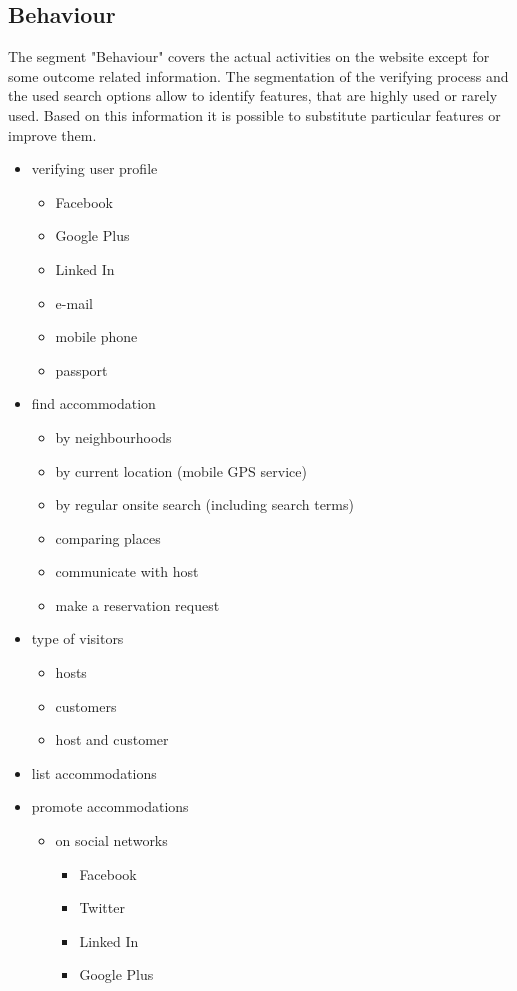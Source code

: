 \subsection{Behaviour}
The segment "Behaviour" covers the actual activities on the website except for some outcome related information. The segmentation of the verifying process and the used search options allow to identify features, that are highly used or rarely used. Based on this information it is possible to substitute particular features or improve them. 

\begin{itemize}
\item verifying user profile 
\begin{itemize}
\item Facebook
\item Google Plus
\item Linked In
\item e-mail
\item mobile phone
\item passport
\end{itemize}
\item find accommodation
\begin{itemize}
\item by neighbourhoods
\item by current location (mobile GPS service)
\item by regular onsite search (including search terms)
\item comparing places 
\item communicate with host
\item make a reservation request
\end{itemize}
\item type of visitors
\begin{itemize}
\item hosts 
\item customers 
\item host and customer
\end{itemize}
\item list accommodations
\item promote accommodations 
\begin{itemize}
\item on social networks 
\begin{itemize}
\item Facebook 
\item Twitter
\item Linked In
\item Google Plus

\end{itemize}
\end{itemize}
\end{itemize}
